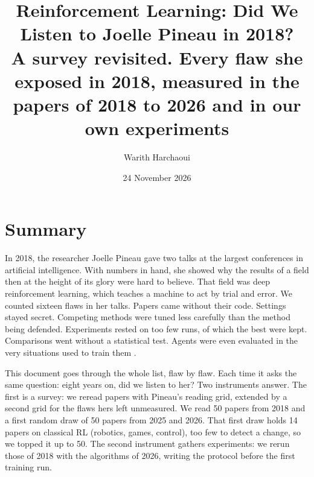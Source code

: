 \documentclass[11pt,a4paper]{article}
\title{\textbf{Reinforcement Learning: Did We Listen to Joelle Pineau in
2018?}\\[0.4em]\large A survey revisited. Every flaw she exposed in
2018, measured in the papers of 2018 to 2026 and in our own experiments}
\author{Warith Harchaoui}
\date{24 November 2026}
\begin{document}
\maketitle

\section*{Summary}\label{summary}

In 2018, the researcher Joelle Pineau gave two talks at the largest
conferences in artificial intelligence. With numbers in hand, she showed
why the results of a field then at the height of its glory were hard to
believe. That field was deep reinforcement learning, which teaches a
machine to act by trial and error. We counted sixteen flaws in her
talks. Papers came without their code. Settings stayed secret. Competing
methods were tuned less carefully than the method being defended.
Experiments rested on too few runs, of which the best were kept.
Comparisons went without a statistical test. Agents were even evaluated
in the very situations used to train them
\autocite{pineau2018iclr,pineau2018neurips,henderson2018matters}.

This document goes through the whole list, flaw by flaw. Each time it
asks the same question: eight years on, did we listen to her? Two
instruments answer. The first is a survey: we reread papers with
Pineau's reading grid, extended by a second grid for the flaws hers left
unmeasured. We read 50 papers from 2018 and a first random draw of 50
papers from 2025 and 2026. That first draw holds 14 papers on classical
RL (robotics, games, control), too few to detect a change, so we topped
it up to 50. The second instrument gathers experiments: we rerun those
of 2018 with the algorithms of 2026, writing the protocol before the
first training run.
\end{document}
